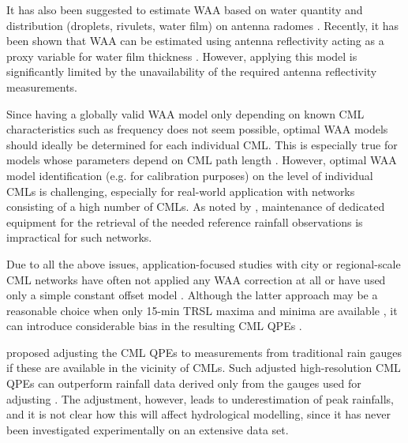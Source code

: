 \documentclass{ctuthesis}\usepackage[]{graphicx}\usepackage[]{color}
\begin{document}
It has also been suggested to estimate WAA based on water quantity and distribution (droplets, rivulets, water film) on antenna radomes \citep{leijnseMicrowaveLinkRainfall2008, manciniImpactWetSBand2019}. Recently, it has been shown that WAA can be estimated using antenna reflectivity acting as a proxy variable for water film thickness \citep{moroderModelingWetAntenna2019}. However, applying this model is significantly limited by the unavailability of the required antenna reflectivity measurements.

Since having a globally valid WAA model only depending on known CML characteristics such as frequency does not seem possible, optimal WAA models should ideally be determined for each individual CML. This is especially true for models whose parameters depend on CML path length \citep[e.g.][]{kharadlyEffectWetAntenna2001}. However, optimal WAA model identification (e.g. for calibration purposes) on the level of individual CMLs is challenging, especially for real-world application with networks consisting of a high number of CMLs. As noted by \citep{ostrometzkyWetAntennaEffectFactor2018}, maintenance of dedicated equipment for the retrieval of the needed reference rainfall observations is impractical for such networks. 

Due to all the above issues, application-focused studies with city or regional-scale CML networks have often not applied any WAA correction at all \citep{chwalaPrecipitationObservationUsing2012, smiatekPotentialCommercialMicrowave2017} or have used only a simple constant offset model \citep{overeemMeasuringUrbanRainfall2011, roversiCommercialMicrowaveLinks2020, fenclAtmosphericObservationsEband2020}. Although the latter approach may be a reasonable choice when only 15-min TRSL maxima and minima are available \citep{chwalaCommercialMicrowaveLink2019}, it can introduce considerable bias in the resulting CML QPEs \citep{fenclQuantifyingWetAntenna2019}.

\cite{fenclGaugeadjustedRainfallEstimates2017} proposed adjusting the CML QPEs to measurements from traditional rain gauges if these are available in the vicinity of CMLs. Such adjusted high-resolution CML QPEs can outperform rainfall data derived only from the gauges used for adjusting \citep{fenclGaugeadjustedRainfallEstimates2017}. The adjustment, however, leads to underestimation of peak rainfalls, and it is not clear how this will affect hydrological modelling, since it has never been investigated experimentally on an extensive data set.
\end{document}
